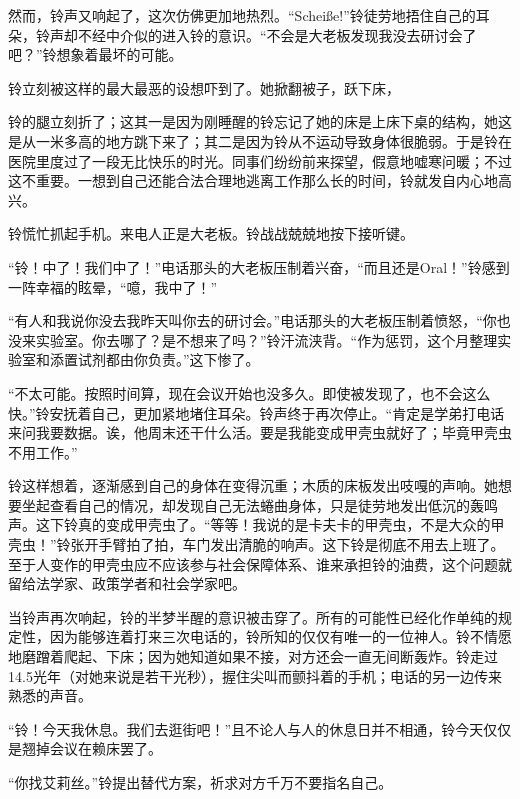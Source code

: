 然而，铃声又响起了，这次仿佛更加地热烈。“Scheiße!”铃徒劳地捂住自己的耳朵，铃声却不经中介似的进入铃的意识。“不会是大老板发现我没去研讨会了吧？”铃想象着最坏的可能。

\begin{branch}
\badend 铃立刻被这样的最大最恶的设想吓到了。她掀翻被子，跃下床，

\gutend 铃的腿立刻折了；这其一是因为刚睡醒的铃忘记了她的床是上床下桌的结构，她这是从一米多高的地方跳下来了；其二是因为铃从不运动导致身体很脆弱。于是铃在医院里度过了一段无比快乐的时光。同事们纷纷前来探望，假意地嘘寒问暖；不过这不重要。一想到自己还能合法合理地逃离工作那么长的时间，铃就发自内心地高兴。

\badend 铃慌忙抓起手机。来电人正是大老板。铃战战兢兢地按下接听键。

\gutend “铃！中了！我们中了！”电话那头的大老板压制着兴奋，“而且还是Oral！”铃感到一阵幸福的眩晕，“噫，我中了！”

\badend “有人和我说你没去我昨天叫你去的研讨会。”电话那头的大老板压制着愤怒，“你也没来实验室。你去哪了？是不想来了吗？”铃汗流浃背。“作为惩罚，这个月整理实验室和添置试剂都由你负责。”这下惨了。
\end{branch}

“不太可能。按照时间算，现在会议开始也没多久。即使被发现了，也不会这么快。”铃安抚着自己，更加紧地堵住耳朵。铃声终于再次停止。“肯定是学弟打电话来问我要数据。诶，他周末还干什么活。要是我能变成甲壳虫就好了；毕竟甲壳虫不用工作。”

\begin{branch}
\gutend 铃这样想着，逐渐感到自己的身体在变得沉重；木质的床板发出吱嘎的声响。她想要坐起查看自己的情况，却发现自己无法蜷曲身体，只是徒劳地发出低沉的轰鸣声。这下铃真的变成甲壳虫了。“等等！我说的是卡夫卡的甲壳虫，不是大众的甲壳虫！”铃张开手臂拍了拍，车门发出清脆的响声。这下铃是彻底不用去上班了。至于人变作的甲壳虫应不应该参与社会保障体系、谁来承担铃的油费，这个问题就留给法学家、政策学者和社会学家吧。
\end{branch}

当铃声再次响起，铃的半梦半醒的意识被击穿了。所有的可能性已经化作单纯的规定性，因为能够连着打来三次电话的，铃所知的仅仅有唯一的一位神人。铃不情愿地磨蹭着爬起、下床；因为她知道如果不接，对方还会一直无间断轰炸。铃走过14.5光年（对她来说是若干光秒），握住尖叫而颤抖着的手机；电话的另一边传来熟悉的声音。

“铃！今天我休息。我们去逛街吧！”且不论人与人的休息日并不相通，铃今天仅仅是翘掉会议在赖床罢了。

“你找艾莉丝。”铃提出替代方案，祈求对方千万不要指名自己。

